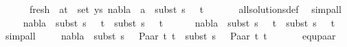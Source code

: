 \begin{isabellebody}
\ \ \ \ \ \ fresh{\isacharcolon}{\kern0pt}\ {\isachardoublequoteopen}{\isasymforall}\ {\isacharparenleft}{\kern0pt}a{\isacharcomma}{\kern0pt}t{\isacharparenright}{\kern0pt}\ {\isasymin}\ set\ ys{\isachardot}{\kern0pt}\ nabla{}\ {\isasymturnstile}\ a\ {\isasymsharp}\ subst\ {\isacharparenleft}{\kern0pt}s{}\ {\isasymbullet}\ {\isacharbrackleft}{\kern0pt}{\isacharbrackright}{\kern0pt}{\isacharparenright}{\kern0pt}\ t{\isachardoublequoteclose}\isanewline
\ \ \ \ \ \isamarkupfalse%
\ all{\isacharunderscore}{\kern0pt}solutions{\isacharunderscore}{\kern0pt}def\ \isamarkupfalse%
\ simp{\isacharunderscore}{\kern0pt}all\isanewline
\ \ \ \isamarkupfalse%
\ {\isachardoublequoteopen}nabla{}\ {\isasymturnstile}\ subst\ {\isacharparenleft}{\kern0pt}s{}\ {\isasymbullet}\ {\isacharbrackleft}{\kern0pt}{\isacharbrackright}{\kern0pt}{\isacharparenright}{\kern0pt}\ t{}\ {\isasymapprox}\ subst\ {\isacharparenleft}{\kern0pt}s{}\ {\isasymbullet}\ {\isacharbrackleft}{\kern0pt}{\isacharbrackright}{\kern0pt}{\isacharparenright}{\kern0pt}\ t{}{\isachardoublequoteclose}\ \isanewline
\ \ \ \ \ {\isachardoublequoteopen}nabla{}\ {\isasymturnstile}\ subst\ {\isacharparenleft}{\kern0pt}s{}\ {\isasymbullet}\ {\isacharbrackleft}{\kern0pt}{\isacharbrackright}{\kern0pt}{\isacharparenright}{\kern0pt}\ t{}\ {\isasymapprox}\ subst\ {\isacharparenleft}{\kern0pt}s{}\ {\isasymbullet}\ {\isacharbrackleft}{\kern0pt}{\isacharbrackright}{\kern0pt}{\isacharparenright}{\kern0pt}\ t{}{\isachardoublequoteclose}\ \isamarkupfalse%
\ simp{\isacharunderscore}{\kern0pt}all\isanewline
\ \ \ \isamarkupfalse%
\ {\isachardoublequoteopen}nabla{}\ {\isasymturnstile}\ subst\ {\isacharparenleft}{\kern0pt}s{}\ {\isasymbullet}\ {\isacharbrackleft}{\kern0pt}{\isacharbrackright}{\kern0pt}{\isacharparenright}{\kern0pt}\ {\isacharparenleft}{\kern0pt}Paar\ t{}\ t{}{\isacharparenright}{\kern0pt}\ {\isasymapprox}\ subst\ {\isacharparenleft}{\kern0pt}s{}\ {\isasymbullet}\ {\isacharbrackleft}{\kern0pt}{\isacharbrackright}{\kern0pt}{\isacharparenright}{\kern0pt}\ {\isacharparenleft}{\kern0pt}Paar\ t{}\ t{}{\isacharparenright}{\kern0pt}{\isachardoublequoteclose}\isanewline
\ \ \ \ \ \isamarkupfalse%
\ equ{\isacharunderscore}{\kern0pt}paar\ \isamarkupfalse%

\end{isabellebody}
